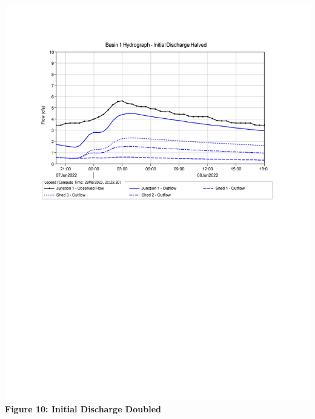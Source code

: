 \documentclass{article}
\begin{document}
\begin{center}
    \includegraphics*[scale=0.7, trim = {0 13cm 0 3.1cm}]{results/Basin_1_Hydrograph_-_Initial_Discharge_Halved.pdf}
    \vspace{5mm}
    {\large{\bf \\Figure 10: Initial Discharge Doubled\\}}

\end{center}
\end{document}
